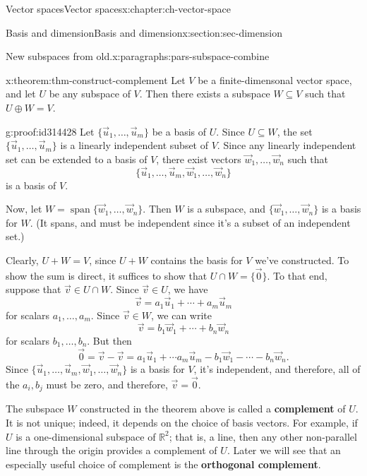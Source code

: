 \documentclass[oneside,10pt,]{book}
\newcommand{\terminology}[1]{\textbf{#1}}
\numberwithin{equation}{section}
\newcommand{\spn}{\operatorname{span}}
\newcommand{\R}{\mathbb{R}}
\begin{document}
\begin{chapterptx}{Vector spaces}{}{Vector spaces}{}{}{x:chapter:ch-vector-space}
\begin{sectionptx}{Basis and dimension}{}{Basis and dimension}{}{}{x:section:sec-dimension}
\begin{paragraphs}{New subspaces from old.}{x:paragraphs:pars-subspace-combine}
\begin{theorem}{}{}{x:theorem:thm-construct-complement}
Let \(V\) be a finite-dimensonal vector space, and let \(U\) be any subspace of \(V\). Then there exists a subspace \(W\subseteq V\) such that \(U\oplus W = V\).%
\end{theorem}
\begin{proofptx}{}{g:proof:id314428}
Let \(\{\vec{u}_1,\ldots, \vec{u}_m\}\) be a basis of \(U\). Since \(U\subseteq W\), the set \(\{\vec{u}_1,\ldots, \vec{u}_m\}\) is a linearly independent subset of \(V\). Since any linearly independent set can be extended to a basis of \(V\), there exist vectors \(\vec{w}_1,\ldots,\vec{w}_n\) such that%
\begin{equation*}
\{\vec{u}_1,\ldots, \vec{u}_m,\vec{w}_1,\ldots, \vec{w}_n\}
\end{equation*}
is a basis of \(V\).%
\par
Now, let \(W = \spn\{\vec{w}_1,\ldots, \vec{w}_n\}\). Then \(W\) is a subspace, and \(\{\vec{w}_1,\ldots, \vec{w}_n\}\) is a basis for \(W\). (It spans, and must be independent since it's a subset of an independent set.)%
\par
Clearly, \(U+W=V\), since \(U+W\) contains the basis for \(V\) we've constructed. To show the sum is direct, it suffices to show that \(U\cap W = \{\vec{0}\}\). To that end, suppose that \(\vec{v}\in U\cap W\). Since \(\vec{v}\in U\), we have%
\begin{equation*}
\vec{v}=a_1\vec{u}_1+\cdots +a_m\vec{u}_m
\end{equation*}
for scalars \(a_1,\ldots, a_m\). Since \(\vec{v}\in W\), we can write%
\begin{equation*}
\vec{v}=b_1\vec{w}_1+\cdots + b_n\vec{w}_n
\end{equation*}
for scalars \(b_1,\ldots, b_n\). But then%
\begin{equation*}
\vec{0}=\vec{v}-\vec{v}=a_1\vec{u}_1+\cdots a_m\vec{u}_m-b_1\vec{w}_1-\cdots -b_n\vec{w}_n.
\end{equation*}
Since \(\{\vec{u}_1,\ldots, \vec{u}_m,\vec{w}_1,\ldots, \vec{w}_n\}\) is a basis for \(V\), it's independent, and therefore, all of the \(a_i,b_j\) must be zero, and therefore, \(\vec{v}=\vec{0}\).%
\end{proofptx}
The subspace \(W\) constructed in the theorem above is called a \terminology{complement} of \(U\). It is not unique; indeed, it depends on the choice of basis vectors. For example, if \(U\) is a one-dimensional subspace of \(\R^2\); that is, a line, then any other non-parallel line through the origin provides a complement of \(U\). Later we will see that an especially useful choice of complement is the \terminology{orthogonal complement}.%
\end{paragraphs}%
\end{sectionptx}
\end{chapterptx}
\end{document}
